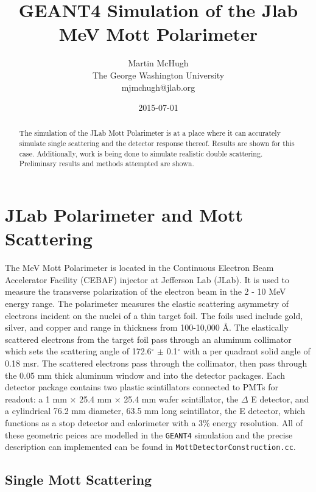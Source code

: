 \documentclass[11pt]{article}
\title{\textbf{GEANT4 Simulation of the Jlab MeV Mott Polarimeter}}
\author{Martin McHugh\\
		The George Washington University\\
		mjmchugh@jlab.org}
\date{2015-07-01}
\begin{document}
\maketitle

\begin{abstract}
The simulation of the JLab Mott Polarimeter is at a place where it can accurately simulate single scattering and the detector response thereof. Results are shown for this case. Additionally, work is being done to simulate realistic double scattering. Preliminary results and methods attempted are shown. 
\end{abstract}

\section{JLab Polarimeter and Mott Scattering}

The MeV Mott Polarimeter is located in the Continuous Electron Beam Accelerator Facility (CEBAF) injector at Jefferson Lab (JLab). It is used to measure the transverse polarization of the electron beam in the 2 - 10 MeV energy range. The polarimeter measures the elastic scattering asymmetry of electrons incident on the nuclei of a thin target foil. The foils used include gold, silver, and copper and range in thickness from 100-10,000 \AA. The elastically scattered electrons from the target foil pass through an aluminum collimator which sets the scattering angle of 172.6$^\circ$ $ \pm$ 0.1$^\circ$ with a per quadrant solid angle of 0.18 msr. The scattered electrons pass through the collimator, then pass through the 0.05 mm thick aluminum window and into the detector packages. Each detector package contains two plastic scintillators connected to PMTs for readout: a 1 mm $\times$ 25.4 mm $\times$ 25.4 mm wafer scintillator, the $\Delta$ E detector, and a cylindrical 76.2 mm diameter, 63.5 mm long scintillator, the E detector, which functions as a stop detector and calorimeter with a 3\% energy resolution. All of these geometric peices are modelled in the \texttt{GEANT4} simulation and the precise description can implemented can be found in \texttt{MottDetectorConstruction.cc}.

\subsection{Single Mott Scattering}
\end{document}
